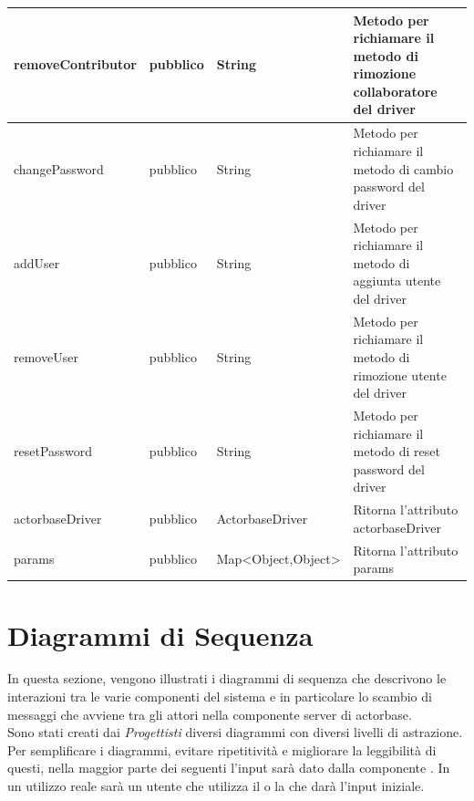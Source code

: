 \documentclass{scalatekids-article}
\begin{document}
\begin{tabular}{| p{3cm} | p{1.5cm} | p{3.5cm} | p{9cm} |}
  \hline
  removeContributor & pubblico & String & Metodo per richiamare il metodo di rimozione collaboratore del driver\\
  \hline
  changePassword & pubblico & String & Metodo per richiamare il metodo di cambio password del driver\\
  \hline
  addUser & pubblico & String & Metodo per richiamare il metodo di aggiunta utente del driver\\
  \hline
  removeUser & pubblico & String & Metodo per richiamare il metodo di rimozione utente del driver\\
  \hline
  resetPassword & pubblico & String & Metodo per richiamare il metodo di reset password del driver\\
  \hline
  actorbaseDriver & pubblico & ActorbaseDriver & Ritorna l'attributo actorbaseDriver\\
  \hline
  params & pubblico & Map<Object,Object> & Ritorna l'attributo params\\
  \hline
\end{tabular}

\section{Diagrammi di Sequenza}

In questa sezione, vengono illustrati i diagrammi di sequenza che descrivono
le interazioni tra le varie componenti del sistema e in particolare lo scambio
di messaggi che avviene tra gli attori nella componente server di actorbase.\\
Sono stati creati dai \textit{Progettisti} diversi diagrammi con diversi livelli
di astrazione.\\
Per semplificare i diagrammi, evitare ripetitività e migliorare la leggibilità di
questi, nella maggior parte dei seguenti l'input sarà dato dalla componente . In un utilizzo reale sarà un utente che utilizza il  o la
 che darà l'input iniziale.
\end{document}
